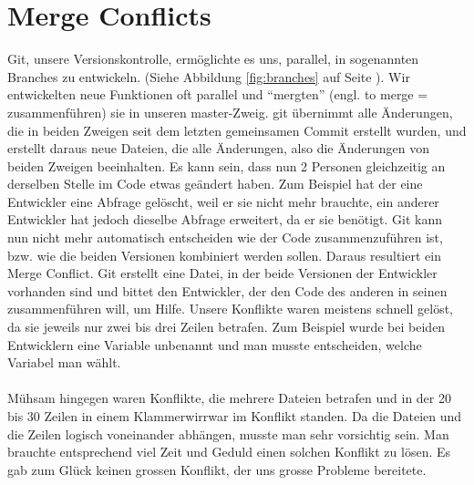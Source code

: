 \documentclass[11pt,a4paper]{scrbook}
\newcommand{\q}[1]{``#1''}
\begin{document}
\section{Merge Conflicts}
Git, unsere Versionskontrolle, ermöglichte es uns, parallel, in sogenannten Branches zu entwickeln. (Siehe Abbildung \ref{fig:branches} auf Seite \pageref{fig:branches}). Wir entwickelten neue Funktionen oft parallel und \q{mergten} (engl. to merge = zusammenführen) sie in unseren master-Zweig.
git übernimmt alle Änderungen, die in beiden Zweigen seit dem letzten gemeinsamen Commit erstellt wurden, und erstellt daraus neue Dateien, die alle Änderungen,
also die Änderungen von beiden Zweigen beeinhalten. Es kann sein, dass nun 2 Personen gleichzeitig an derselben Stelle im Code etwas geändert haben. Zum Beispiel
hat der eine Entwickler eine Abfrage gelöscht, weil er sie nicht mehr brauchte, ein anderer Entwickler hat jedoch dieselbe Abfrage erweitert, da er sie benötigt.
Git kann nun nicht mehr automatisch entscheiden wie der Code zusammenzuführen ist, bzw. wie die beiden Versionen kombiniert werden sollen. Daraus resultiert ein Merge
Conflict. Git erstellt eine Datei, in der beide Versionen der Entwickler vorhanden sind und bittet den Entwickler, der den Code des anderen in seinen zusammenführen
will, um Hilfe. Unsere Konflikte waren meistens schnell gelöst, da sie jeweils nur zwei bis drei Zeilen betrafen. Zum Beispiel wurde bei beiden Entwicklern
eine Variable unbenannt und man musste entscheiden, welche Variabel man wählt.\\
\\
Mühsam hingegen waren Konflikte, die mehrere Dateien betrafen und in der 20 bis 30 Zeilen in einem Klammerwirrwar im Konflikt standen. Da die Dateien und die Zeilen
logisch voneinander abhängen, musste man sehr vorsichtig sein. Man brauchte entsprechend viel Zeit und Geduld einen solchen Konflikt zu lösen. Es gab zum Glück keinen
grossen Konflikt, der uns grosse Probleme bereitete.
\end{document}
